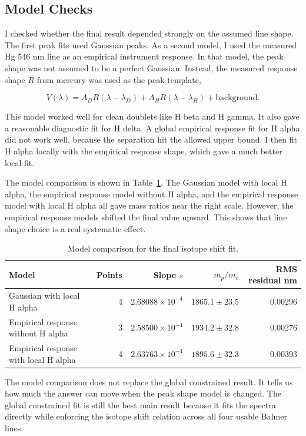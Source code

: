 \documentclass[11pt]{article}
\begin{document}
\subsection{Model Checks}

I checked whether the final result depended strongly on the assumed line shape. The first peak fits used Gaussian peaks. As a second model, I used the measured Hg 546 nm line as an empirical instrument response. In that model, the peak shape was not assumed to be a perfect Gaussian. Instead, the measured response shape \(R\) from mercury was used as the peak template,

\[
V(\lambda)
=
A_D R(\lambda-\lambda_D)
+
A_H R(\lambda-\lambda_H)
+
\text{background}.
\]

This model worked well for clean doublets like H beta and H gamma. It also gave a reasonable diagnostic fit for H delta. A global empirical response fit for H alpha did not work well, because the separation hit the allowed upper bound. I then fit H alpha locally with the empirical response shape, which gave a much better local fit.

The model comparison is shown in Table~\ref{tab:modelcompare}. The Gaussian model with local H alpha, the empirical response model without H alpha, and the empirical response model with local H alpha all gave mass ratios near the right scale. However, the empirical response models shifted the final value upward. This shows that line shape choice is a real systematic effect.

\begin{table}[htbp]
\centering
\caption{Model comparison for the final isotope shift fit.}
\label{tab:modelcompare}
\begin{tabular}{lrrrr}
\hline
Model & Points & Slope \(s\) & \(m_p/m_e\) & RMS residual nm \\
\hline
Gaussian with local H alpha & 4 & \(2.68088\times10^{-4}\) & \(1865.1 \pm 23.5\) & 0.00296 \\
Empirical response without H alpha & 3 & \(2.58500\times10^{-4}\) & \(1934.2 \pm 32.8\) & 0.00276 \\
Empirical response with local H alpha & 4 & \(2.63763\times10^{-4}\) & \(1895.6 \pm 32.3\) & 0.00393 \\
\hline
\end{tabular}
\end{table}

The model comparison does not replace the global constrained result. It tells us how much the answer can move when the peak shape model is changed. The global constrained fit is still the best main result because it fits the spectra directly while enforcing the isotope shift relation across all four usable Balmer lines.
\end{document}
